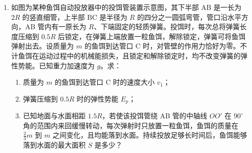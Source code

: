 \documentclass[\gkver]{gaokaozhenti}
\begin{document}
\begin{enumerate}
{\begin{enumerate}
\end{enumerate}
}

\item
如图为某种鱼饵自动投放器中的投饵管装置示意图，其下半部 AB 是一长为 $2R$ 的竖直细管，上半部 BC 是半径为 $R$ 的四分之一圆弧弯管，管口沿水平方向，AB 管内有一原长为 $R$、下端固定的轻质弹簧。投饵时，每次总将弹簧长度压缩到 $0.5R$ 后锁定，在弹簧上端放置一粒鱼饵，解除锁定，弹簧可将鱼饵弹射出去。设质量为 $m$ 的鱼饵到达管口 C 时，对管壁的作用力恰好为零。不计鱼饵在运动过程中的机械能损失，且锁定和解除锁定时，均不改变弹簧的弹性势能。已知重力加速度为 $g$。求：
\begin{enumerate}
	\item
	质量为 $m$ 的鱼饵到达管口 C 时的速度大小 $v_{1}$；
	\item
	弹簧压缩到 $0.5R$ 时的弹性势能 $E_{p}$；
	\item
	已知地面与水面相距 $1.5R$，若使该投饵管绕 AB 管的中轴线 $OO'$ 在 $90^\circ$ 角的范围内来回缓慢转动，每次弹射时只放置一粒鱼饵，鱼饵的质量在 $\frac{2}{3}m$ 到 $m$ 之间变化，且均能落到水面。持续投放足够长时间后，鱼饵能够落到水面的最大面积 $S$ 是多少？
\end{enumerate}


\end{enumerate}
\end{document}
